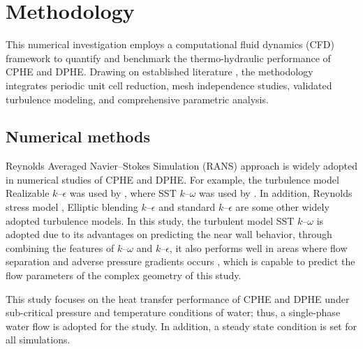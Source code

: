 \documentclass[review,12pt]{elsarticle}
\begin{document}
\section{Methodology}
\label{sec:methodology}

This numerical investigation employs a computational fluid dynamics (CFD) framework to quantify and benchmark the thermo-hydraulic performance of CPHE and DPHE. Drawing on established literature \citep{jiang2019, mocnik2020}, the methodology integrates periodic unit cell reduction, mesh independence studies, validated turbulence modeling, and comprehensive parametric analysis. 

\subsection{Numerical methods}
\label{sec:numerical_methods}

Reynolds Averaged Navier--Stokes Simulation (RANS) approach is widely adopted in numerical studies of CPHE and DPHE. For example, the turbulence model Realizable $k$--$\epsilon$ was used by \citet{kumar2019, jing2019, mocnik2020, mocnik2024}, where SST $k$--$\omega$ was used by \citet{hamedi2024, jiang2019a, jiang2020, mocnik2020, mocnik2024, torre2019}. In addition, Reynolds stress model \citep{shao2024, mocnik2023}, Elliptic blending $k$--$\epsilon$ \citep{arsenyeva2019, piper2019} and standard $k$--$\epsilon$ \citep{soman2022} are some other widely adopted turbulence models. In this study, the turbulent model SST $k$--$\omega$ is adopted due to its advantages on predicting the near wall behavior, through combining the features of $k$--$\omega$ and $k$--$\epsilon$, it also performs well in areas where flow separation and adverse pressure gradients occurs \citep{kanaris2006, khail2023, menter1994}, which is capable to predict the flow parameters of the complex geometry of this study. 

This study focuses on the heat transfer performance of CPHE and DPHE under sub-critical pressure and temperature conditions of water; thus, a single-phase water flow is adopted for the study. In addition, a steady state condition is set for all simulations.
\end{document}
